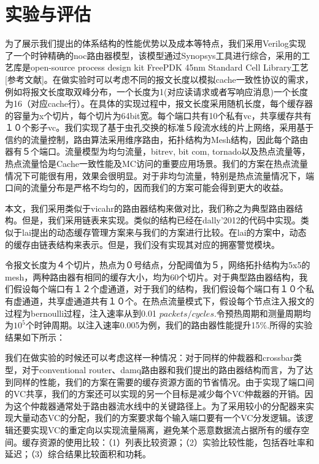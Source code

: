 ﻿\documentclass[10pt,journal]{IEEEtran}
\begin{document}
\section{实验与评估}\label{experiemnts}
为了展示我们提出的体系结构的性能优势以及成本等特点，我们采用Verilog实现了一个时钟精确的noc路由器模型，该模型通过Synopsys工具进行综合，采用的工艺库是open-source process design kit FreePDK 45nm Standard Cell Library工艺[参考文献]。在做实验时可以考虑不同的报文长度以模拟cache一致性协议的需求，例如将报文长度取双峰分布，一个长度为1(对应读请求或者写响应消息)一个长度为16（对应cache行）。在具体的实现过程中，报文长度采用随机长度，每个缓存器的容量为x个切片，每个切片为64bit宽。每个端口共有10个私有vc，共享缓存共有１０个影子vc。我们实现了基于虫孔交换的标准５段流水线的片上网络，采用基于信约的流量控制，路由算法采用维序路由，拓扑结构为Mesh结构，因此每个路由器有５个端口。流量模型为均匀流量，bitrev, bit com, tornado以及热点流量等，热点流量恰是Cache一致性能及MC访问的重要应用场景。我们的方案在热点流量情况下可能很有用，效果会很明显。对于非均匀流量，特别是热点流量情况下，端口间的流量分布是严格不均匀的，因而我们的方案可能会得到更大的收益。

本文，我们采用类似于vicahr的路由器结构来做对比，我们称之为典型路由器结构。但是，我们采用链表来实现。类似的结构已经在dally'2012的代码中实现。类似于lai提出的动态缓存管理方案来与我们的方案进行比较。在lai的方案中，动态的缓存由链表结构来表示。但是，我们没有实现其对应的拥塞警觉模块。

令报文长度为４个切片，热点为０号结点，分配阈值为５，网络拓扑结构为5x5的mesh，两种路由器有相同的缓存大小，均为60个切片。对于典型路由器结构，我们假设每个端口有１２个虚通道，对于我们的结构，我们假设每个端口有１０个私有虚通道，共享虚通道共有１０个。在热点流量模式下，假设每个节点注入报文的过程为bernoulli过程，注入速率从到0.01 $packets/cycles$.令预热周期和测量周期均为$10^5$个时钟周期。以注入速率0.005为例，我们的路由器性能提升15\%.所得的实验结果如下所示：

我们在做实验的时候还可以考虑这样一种情况：对于同样的仲裁器和crossbar类型，对于conventional router、damq路由器和我们提出的路由器结构而言，为了达到同样的性能，我们的方案在需要的缓存资源方面的节省情况。由于实现了端口间的VC共享，我们的方案还可以实现的另一个目标是减少每个VC仲裁器的开销。因为这个仲裁器通常处于路由器流水线中的关键路径上。为了采用较小的分配器来实现大量动态VC的分配，我们的方案要求每个输入端口要有一个VC分发逻辑。该逻辑还要实现VC的重定向以实现流量隔离，避免某个恶意数据流占据所有的缓存空间。缓存资源的使用比较：（1）列表比较资源；（2）实验比较性能，包括吞吐率和延迟；（3）综合结果比较面积和功耗。
\end{document}
